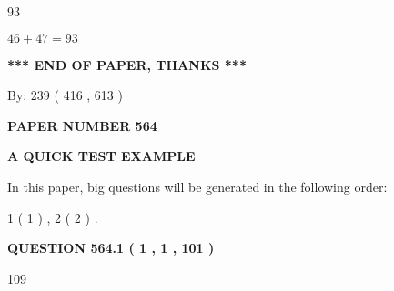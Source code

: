 \documentclass[12pt]{article}
\begin{document}
 
\noindent{}

93
 
 
 
 
\noindent{}

$ %
46 +  %
47=   %
93$
 
 
   
   
 \vspace{0.2in}
 
   
   
   
   
\vspace{1.0in} 
{\textbf{\large{ *** END OF PAPER, THANKS *** }}} 
   
   
\hspace{1.0in} By: 
 239 ( 416 ,  613 )
   
   
   
   
\newpage 
\setcounter{page}{ 
   564001 } 
   
   
   
   
 {\textbf{ \Large{ PAPER NUMBER  564  }}}
   
   
\vspace{0.2in}
   
   
   
   
   
   
 \vspace{0.2in}
{\LARGE {\textbf{ A QUICK TEST EXAMPLE}}}
   
   
   
\vspace{0.2in}
   
In this paper, big questions will be generated in the following order: 
   
   
   1 ( 1 )
 ,
   2 ( 2 )
 .
  
\vspace{0.2in}
  
{\textbf{\Large{QUESTION
564.1 
 ( 1 , 1 , 101 )
}}}
  
  
 
 
\noindent{}

109
 
 
 
 
\noindent{}
\end{document}

